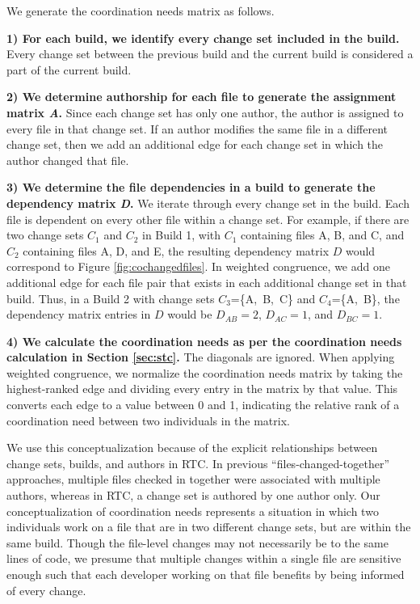 We generate the coordination needs matrix as follows.

\textbf{1) For each build, we identify every change set included in the build.} Every change set between the previous build and the current build is considered a part of the current build.

\textbf{2) We determine authorship for each file to generate the assignment matrix \emph{A}.} Since each change set has only one author, the author is assigned to every file in that change set. If an author modifies the same file in a different change set, then we add an additional edge for each change set in which the author changed that file.

\textbf{3) We determine the file dependencies in a build to generate the dependency matrix \emph{D}.} We iterate through every change set in the build. Each file is dependent on every other file within a change set. For example, if there are two change sets $C_1$ and $C_2$ in Build 1, with $C_1$ containing files A, B, and C, and $C_2$ containing files A, D, and E, the resulting dependency matrix $D$ would correspond to Figure \ref{fig:cochangedfiles}. In weighted congruence, we add one additional edge for each file pair that exists in each additional change set in that build. Thus, in a Build 2 with change sets $C_3$=\{A,~B,~C\} and $C_4$=\{A,~B\}, the dependency matrix entries in $D$ would be $D_{AB}= 2$, $D_{AC}=1$, and $D_{BC}=1$.

\textbf{4) We calculate the coordination needs as per the coordination needs calculation in Section \ref{sec:stc}.} The diagonals are ignored. When applying weighted congruence, we normalize the coordination needs matrix by taking the highest-ranked edge and dividing every entry in the matrix by that value. This converts each edge to a value between 0 and 1, indicating the relative rank of a coordination need between two individuals in the matrix.

We use this conceptualization because of the explicit relationships between change sets, builds, and authors in RTC. In previous ``files-changed-together'' approaches, multiple files checked in together were associated with multiple authors, whereas in RTC, a change set is authored by one author only. Our conceptualization of coordination needs represents a situation in which two individuals work on a file that are in two different change sets, but are within the same build. Though the file-level changes may not necessarily be to the same lines of code, we presume that multiple changes within a single file are sensitive enough such that each developer working on that file benefits by being informed of every change.

